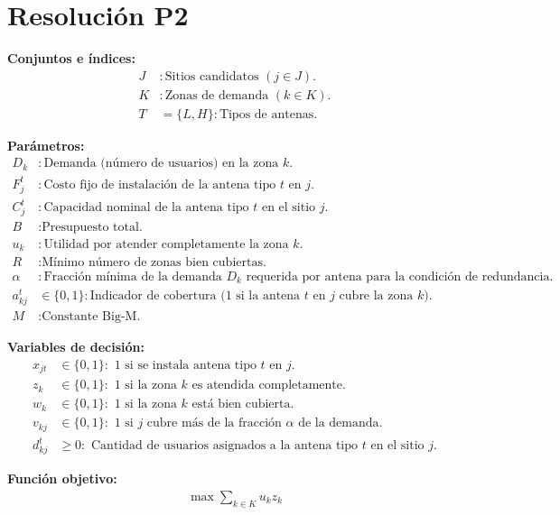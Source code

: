 \section*{Resolución P2}
\textbf{Conjuntos e índices:}
\begin{align*}
J &: \text{Sitios candidatos } (j\in J).\\
K &: \text{Zonas de demanda } (k\in K).\\
T &= \{L,H\}: \text{Tipos de antenas.}
\end{align*}

\textbf{Parámetros:}
\begin{align*}
D_k &: \text{Demanda (número de usuarios) en la zona } k.\\
F_j^t &: \text{Costo fijo de instalación de la antena tipo } t \text{ en } j.\\
C_j^t &: \text{Capacidad nominal de la antena tipo } t \text{ en el sitio } j.\\
B &: \text{Presupuesto total.}\\
u_k &: \text{Utilidad por atender completamente la zona } k.\\
R &: \text{Mínimo número de zonas bien cubiertas.}\\
\alpha &: \text{Fracción mínima de la demanda } D_k \text{ requerida por antena para la condición de redundancia.}\\
a_{kj}^t &\in \{0,1\}: \text{Indicador de cobertura (1 si la antena } t \text{ en } j \text{ cubre la zona } k).\\
M &: \text{Constante Big-M.}
\end{align*}

\textbf{Variables de decisión:}
\begin{align*}
x_{jt} &\in \{0,1\}: \text{ 1 si se instala antena tipo } t \text{ en } j.\\
z_k &\in \{0,1\}: \text{ 1 si la zona } k \text{ es atendida completamente.}\\
w_k &\in \{0,1\}: \text{ 1 si la zona } k \text{ está bien cubierta.}\\
v_{kj} &\in \{0,1\}: \text{ 1 si } j \text{ cubre más de la fracción } \alpha \text{ de la demanda.}\\
d_{kj}^t &\geq 0: \text{ Cantidad de usuarios asignados a la antena tipo } t \text{ en el sitio } j.
\end{align*}

\textbf{Función objetivo:}
\begin{align}
\max \sum_{k\in K} u_k z_k
\end{align}

